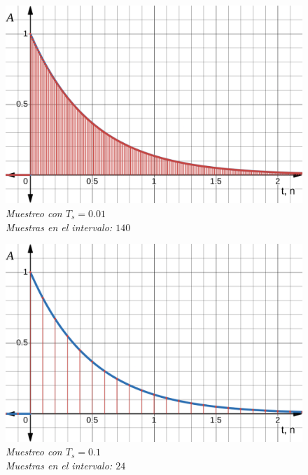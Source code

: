 \documentclass[a4paper,12pt]{report}
\begin{document}
\begin{enumerate}[label=\alph*), left=0pt]
    \begin{figure}[H]
      \centering
      \begin{minipage}{0.55\textwidth}
        \centering
        \includegraphics[width=1\textwidth]{./images/ej1.2.png}
        \textit{Muestreo con $T_s=0.01$\\Muestras en el intervalo: $140$}
      \end{minipage}
    \end{figure}

    \begin{figure}[H]
      \centering
      \begin{minipage}{0.55\textwidth}
        \centering
        \includegraphics[width=1\textwidth]{./images/ej1.3.png}
        \textit{Muestreo con $T_s=0.1$\\Muestras en el intervalo: $24$}
      \end{minipage}
    \end{figure}



\end{enumerate}
\end{document}
